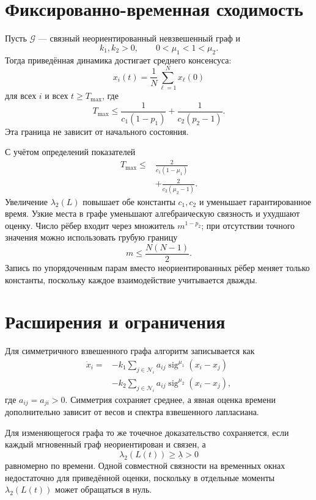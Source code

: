 \section{Фиксированно-временная сходимость}

\begin{theorem}
Пусть \(\mathcal G\) --- связный неориентированный невзвешенный
граф и
\[
    k_1,k_2>0,
    \qquad
    0<\mu_1<1<\mu_2.
\]
Тогда приведённая динамика достигает среднего консенсуса:
\[
    x_i(t)
    =
    \frac1N\sum_{\ell=1}^{N}x_\ell(0)
\]
для всех \(i\) и всех \(t\ge T_{\max}\), где
\[
    T_{\max}
    \le
    \frac1{c_1(1-p_1)}
    +
    \frac1{c_2(p_2-1)}.
\]
Эта граница не зависит от начального состояния.
\end{theorem}

С учётом определений показателей
\[
\begin{aligned}
    T_{\max}
    \le{}&
    \frac{2}{c_1(1-\mu_1)}
    \\
    &+
    \frac{2}{c_2(\mu_2-1)}.
\end{aligned}
\]
Увеличение \(\lambda_2(L)\) повышает обе константы \(c_1,c_2\) и
уменьшает гарантированное время. Узкие места в графе уменьшают
алгебраическую связность и ухудшают оценку. Число рёбер входит через
множитель \(m^{1-p_2}\); при отсутствии точного значения можно
использовать грубую границу
\[
    m\le\frac{N(N-1)}2.
\]
Запись по упорядоченным парам вместо неориентированных рёбер меняет
только константы, поскольку каждое взаимодействие учитывается дважды.

\section{Расширения и ограничения}

Для симметричного взвешенного графа алгоритм записывается как
\[
\begin{aligned}
    \dot x_i
    ={}&
    -k_1
    \sum_{j\in\mathcal N_i}
    a_{ij}\operatorname{sig}^{\mu_1}(x_i-x_j)
    \\
    &-
    k_2
    \sum_{j\in\mathcal N_i}
    a_{ij}\operatorname{sig}^{\mu_2}(x_i-x_j),
\end{aligned}
\]
где \(a_{ij}=a_{ji}>0\). Симметрия сохраняет среднее, а явная оценка
времени дополнительно зависит от весов и спектра взвешенного
лапласиана.

Для изменяющегося графа то же точечное доказательство сохраняется,
если каждый мгновенный граф неориентирован и связен, а
\[
    \lambda_2(L(t))
    \ge
    \underline\lambda>0
\]
равномерно по времени. Одной совместной связности на временных окнах
недостаточно для приведённой оценки, поскольку в отдельные моменты
\(\lambda_2(L(t))\) может обращаться в нуль.

